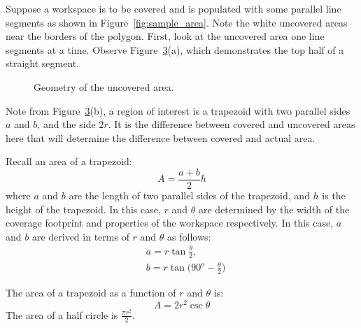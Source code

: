 \documentclass[../main.tex]{subfiles}
\begin{document}
Suppose a workspace is to be covered and is populated with some parallel line segments as shown in Figure~\ref{fig:sample_area}. Note the white uncovered areas near the borders of the polygon. First, look at the uncovered area one line segments at a time. Observe Figure~\ref{fig:area_error}(a), which demonstrates the top half of a straight segment.

%

\begin{figure}
	\centering
	\begin{subfigure}{0.5\linewidth}
		\centering
		\caption{\label{fig:area_error_i}}
	\end{subfigure}%
	\begin{subfigure}{0.5\linewidth}
		\centering
		
		\caption{\label{fig:area_error_ii}}
	\end{subfigure}
	\caption{Geometry of the uncovered area.}
	\label{fig:area_error}
\end{figure}

Note from Figure~\ref{fig:area_error}(b), a region of interest is a trapezoid with two parallel sides $a$ and $b$, and the side $2r$. It is the difference between covered and uncovered areas here that will determine the difference between covered and actual area.

Recall an area of a trapezoid:
\begin{equation}
	A=\frac{a+b}{2}h
\end{equation}
where $a$ and $b$ are the length of two parallel sides of the trapezoid, and $h$ is the height of the trapezoid. In this case, $r$ and $\theta$ are determined by the width of the coverage footprint and properties of the workspace respectively. In this case, $a$ and $b$ are derived in terms of $r$ and $\theta$ as follows:
\begin{equation}
	\begin{aligned}
		&a=r\tan{\frac{\theta}{2}},\\
		&b=r\tan{(90^o-\frac{\theta}{2}})
	\end{aligned}
\end{equation}

The area of a trapezoid as a function of $r$ and $\theta$ is:
\begin{equation}
	A=2r^2\csc{\theta}
\end{equation}
The area of a half circle is $\frac{\pi r^2}{2}$.
\end{document}
